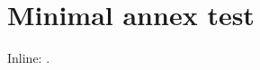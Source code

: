 \documentclass{article}
\begin{document}
\section*{Minimal annex test}
Inline: .
\printPxCodeAnnex[title=Code]
\end{document}
